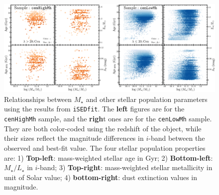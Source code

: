 \documentclass[a4paper,fleqn,usenatbib]{mnras}
\def\rbcg{\texttt{cenHighMh}}
\def\nbcg{\texttt{cenLowMh}}
\def\mstar{{$M_{\star}$}}
\def\m2l{{$M_{\star}/L_{\star}$}}
\begin{document}
    \begin{figure}
        \begin{center}
        \includegraphics[width=\textwidth]{fig/redbcg_isedfit_2.pdf}
        \caption{
            Relationships between \mstar{} and other stellar population 
            parameters using the results from \texttt{iSEDfit}. 
            The \textbf{left} figures are for the \rbcg{} sample, and the 
            \textbf{righ}t ones are 
            for the \nbcg{} sample. 
            They are both color-coded using the redshift of the object, while 
            their sizes reflect the magnitude differences in $i$-band between 
            the observed and best-fit value. 
            The four stellar population properties are: 
            1) \textbf{Top-left}: mass-weighted stellar age in Gyr; 
            2) \textbf{Bottom-left}: \m2l{} in $i$-band; 
            3) \textbf{Top-right}: mass-weighted stellar metallicity in unit of Solar 
            value;
            4) \textbf{bottom-right}: dust extinction values in magnitude.
            }
        \label{fig:ised_2}
        \end{center}
    \end{figure}
\end{document}
